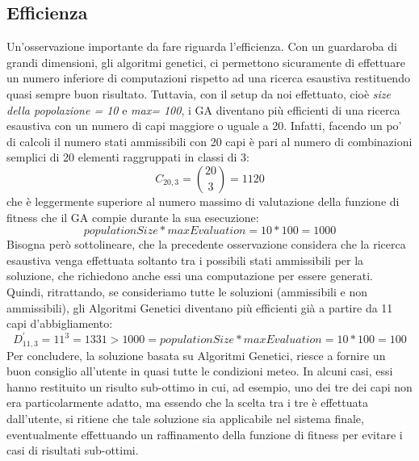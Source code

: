 \documentclass[a4paper, 11pt, oneside]{report}
\begin{document}
            \subsection{Efficienza}\label{subsec:efficienza}
            Un'osservazione importante da fare riguarda l'efficienza.
            Con un guardaroba di grandi dimensioni, gli algoritmi genetici,
            ci permettono sicuramente di effettuare un numero inferiore di computazioni rispetto ad una ricerca esaustiva
            restituendo quasi sempre buon risultato.
            Tuttavia, con il setup da noi effettuato, cioè \emph{size della popolazione = 10} e
            \emph{max= 100}, i GA diventano più efficienti di una ricerca esaustiva con un numero di capi
            maggiore o uguale a 20.
            Infatti, facendo un po' di calcoli il numero stati ammissibili con 20 capi è pari al numero di combinazioni semplici
            di 20 elementi raggruppati in classi di 3:
            \begin{equation*}
                C_{20,3}=\binom{20}{3}= 1120
            \end{equation*}
            che è leggermente superiore al numero massimo di valutazione della funzione di fitness che il GA compie durante la sua esecuzione:
            \begin{equation*}
                populationSize * maxEvaluation = 10 * 100 = 1000
            \end{equation*}
            Bisogna però sottolineare, che la precedente osservazione considera che la ricerca esaustiva venga effettuata soltanto
            tra i possibili stati ammissibili per la soluzione, che richiedono anche essi una computazione per essere generati.
            Quindi, ritrattando, se consideriamo tutte le soluzioni (ammissibili e non ammissibili), gli Algoritmi Genetici diventano più efficienti già a partire da
            11 capi d'abbigliamento:
            \begin{equation*}
                D_{11,3}^{'}=11^3 = 1331  > 1000 = populationSize * maxEvaluation = 10 * 100 = 100
            \end{equation*}
            Per concludere, la soluzione basata su Algoritmi Genetici, riesce a fornire un buon consiglio all'utente
            in quasi tutte le condizioni meteo.
            In alcuni casi, essi hanno restituito un risulto sub-ottimo in cui, ad esempio, uno dei tre dei capi non era
            particolarmente adatto, ma essendo che la scelta tra i tre è effettuata dall'utente, si ritiene che tale soluzione
            sia applicabile nel sistema finale, eventualmente effettuando un raffinamento della funzione di fitness per
            evitare i casi di risultati sub-ottimi.
\end{document}
